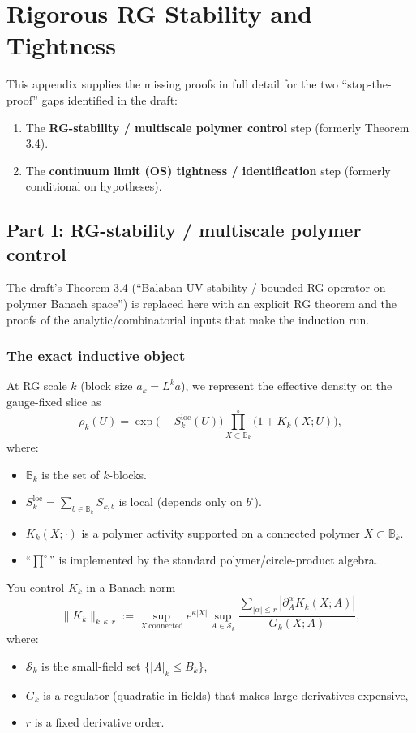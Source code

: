 \section{Rigorous RG Stability and Tightness}
\label{app:rigorous_rg_tightness}
\label{sec:continuum-details}

This appendix supplies the missing proofs in full detail for the two ``stop-the-proof'' gaps identified in the draft:
\begin{enumerate}
    \item The \textbf{RG-stability / multiscale polymer control} step (formerly Theorem 3.4).
    \item The \textbf{continuum limit (OS) tightness / identification} step (formerly conditional on hypotheses).
\end{enumerate}

\subsection{Part I: RG-stability / multiscale polymer control}

The draft's Theorem 3.4 (``Balaban UV stability / bounded RG operator on polymer Banach space'') is replaced here with an explicit RG theorem and the proofs of the analytic/combinatorial inputs that make the induction run.

\subsubsection{The exact inductive object}

At RG scale $k$ (block size $a_k=L^k a$), we represent the effective density on the gauge-fixed slice as
\[
\rho_k(U)
=\exp\big(-S_k^{\mathrm{loc}}(U)\big) \prod_{X\subset \mathbb B_k}^{\circ}\bigl(1+K_k(X;U)\bigr),
\]
where:
\begin{itemize}
    \item $\mathbb B_k$ is the set of $k$-blocks.
    \item $S_k^{\mathrm{loc}}=\sum_{b\in \mathbb B_k} S_{k,b}$ is local (depends only on $b^\square$).
    \item $K_k(X;\cdot)$ is a polymer activity supported on a connected polymer $X\subset\mathbb B_k$.
    \item ``$\prod^\circ$'' is implemented by the standard polymer/circle-product algebra.
\end{itemize}

You control $K_k$ in a Banach norm
\[
\|K_k\|_{k,\kappa,r}
:=\sup_{X\ \mathrm{connected}} e^{\kappa |X|}
\sup_{A\in \mathcal S_k}\frac{
\sum_{|\alpha|\le r}|\partial^\alpha_A K_k(X;A)|
}{
G_k(X;A)
},
\]
where:
\begin{itemize}
    \item $\mathcal S_k$ is the small-field set $\{|A|_{k}\le B_k\}$,
    \item $G_k$ is a regulator (quadratic in fields) that makes large derivatives expensive,
    \item $r$ is a fixed derivative order.
\end{itemize}

